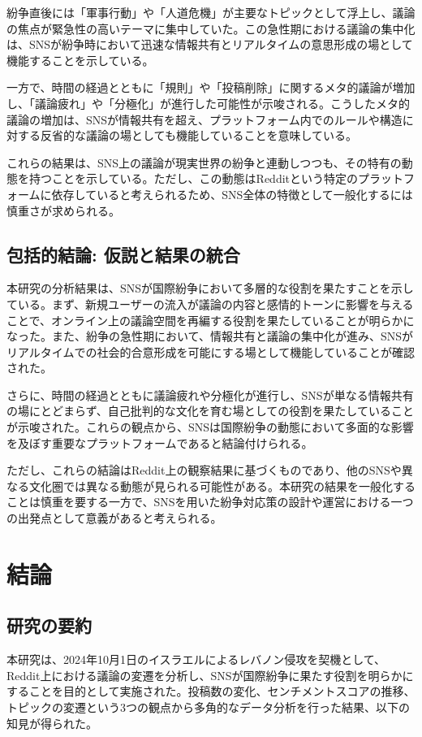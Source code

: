\documentclass[11pt, a4j]{jreport}
\begin{document}
    紛争直後には「軍事行動」や「人道危機」が主要なトピックとして浮上し、議論の焦点が緊急性の高いテーマに集中していた。この急性期における議論の集中化は、SNSが紛争時において迅速な情報共有とリアルタイムの意思形成の場として機能することを示している。
    
    一方で、時間の経過とともに「規則」や「投稿削除」に関するメタ的議論が増加し、「議論疲れ」\citep{sunstein2001republic}や「分極化」\citep{sunstein2001republic}が進行した可能性が示唆される。こうしたメタ的議論の増加は、SNSが情報共有を超え、プラットフォーム内でのルールや構造に対する反省的な議論の場としても機能していることを意味している。

    これらの結果は、SNS上の議論が現実世界の紛争と連動しつつも、その特有の動態を持つことを示している。ただし、この動態はRedditという特定のプラットフォームに依存していると考えられるため、SNS全体の特徴として一般化するには慎重さが求められる。

    \section{包括的結論: 仮説と結果の統合}
    本研究の分析結果は、SNSが国際紛争において多層的な役割を果たすことを示している。まず、新規ユーザーの流入が議論の内容と感情的トーンに影響を与えることで、オンライン上の議論空間を再編する役割を果たしていることが明らかになった。また、紛争の急性期において、情報共有と議論の集中化が進み、SNSがリアルタイムでの社会的合意形成を可能にする場として機能していることが確認された。
    
    さらに、時間の経過とともに議論疲れや分極化が進行し、SNSが単なる情報共有の場にとどまらず、自己批判的な文化を育む場としての役割を果たしていることが示唆された。これらの観点から、SNSは国際紛争の動態において多面的な影響を及ぼす重要なプラットフォームであると結論付けられる。

    ただし、これらの結論はReddit上の観察結果に基づくものであり、他のSNSや異なる文化圏では異なる動態が見られる可能性がある。本研究の結果を一般化することは慎重を要する一方で、SNSを用いた紛争対応策の設計や運営における一つの出発点として意義があると考えられる。

    \chapter{結論}
    
    \section{研究の要約}
    本研究は、2024年10月1日のイスラエルによるレバノン侵攻を契機として、Reddit上における議論の変遷を分析し、SNSが国際紛争に果たす役割を明らかにすることを目的として実施された。投稿数の変化、センチメントスコアの推移、トピックの変遷という3つの観点から多角的なデータ分析を行った結果、以下の知見が得られた。
    
\end{document}
